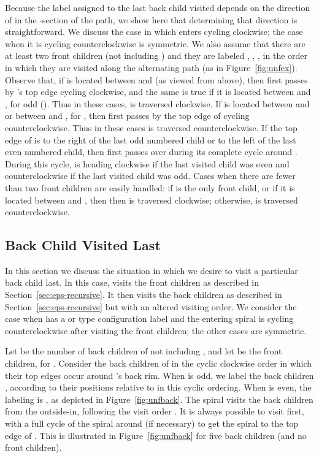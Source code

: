 \documentclass[11pt]{article}
\begin{document}
Because the label assigned to the last back child visited depends
on the direction of  in the -section of the path, we show here that
determining that direction is straightforward.
We discuss the case in which  enters 
cycling clockwise; the case when it is cycling counterclockwise
is symmetric. We also assume that there are at least two front children
(not including ) and
they are labeled , , ,
in the order in which they are visited along the alternating path (as in Figure~\ref{fig:unfex}).
Observe that, if  is located between  and  (as viewed from above),
then  first passes by 's top edge cycling clockwise, and
the same is true if it is located between  and ,
for  odd (). Thus in these cases,  is traversed clockwise.
If  is located between  and  or
between  and , for , then
 first passes by the top edge of  cycling counterclockwise. Thus
in these cases  is traversed counterclockwise.
If the top edge of  is to the right of the last  odd
numbered child or to the left of the last even numbered child, then
 first passes over  during its complete cycle around .
During this cycle,  is heading
clockwise  if the last visited child was even and counterclockwise
if the last visited child was odd. Cases when there are fewer than two
front children are easily handled: if  is the only front child,
or if it is located between  and , then then  is traversed clockwise;
otherwise,  is traversed counterclockwise.


\subsection{Back Child Visited Last}
\label{sec:heavyback}

In this section we discuss the situation in which we desire
to visit a particular back child  last.
In this case,  visits the front children as described in
Section~\ref{sec:eps-recursive}. It then visits the back children as described
in Section~\ref{sec:eps-recursive} but with an altered visiting order.
We consider the case when  has a  or  type configuration
label and the
entering spiral  is cycling counterclockwise after visiting the front children;
the other cases are symmetric.

Let  be the number of back children of  not including ,
and let  be the front children, for .
Consider the back children of  in the cyclic clockwise order in which their top edges
occur around 's back rim.
When  is odd, we label the  back children
,
according to their positions relative to  in this cyclic ordering.
When  is even, the labeling is ,
as depicted in Figure~\ref{fig:unfback}. The spiral
 visits the back children from the outside-in, following the visit order
.
It is always possible to visit  first,
with a full cycle of the spiral around  (if necessary) to get the spiral
to the top edge of . This is illustrated in Figure~\ref{fig:unfback}
for five back children (and no front children).
\end{document}
